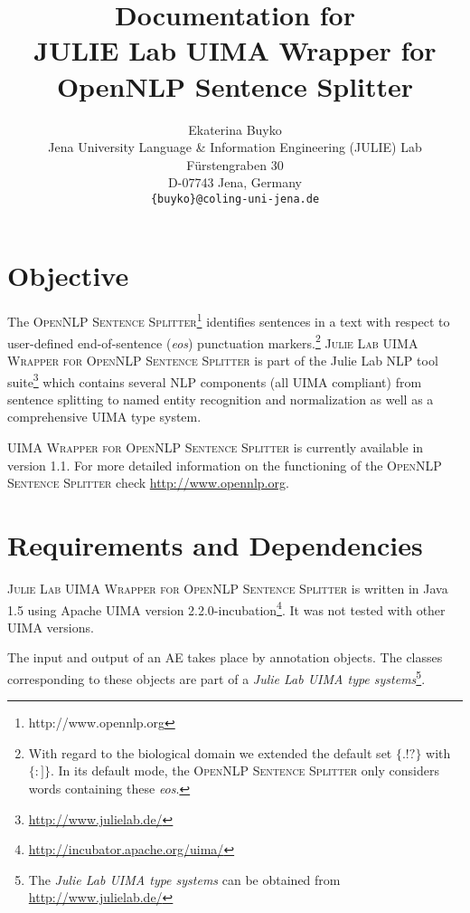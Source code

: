 \documentclass[11pt,a4paper,halfparskip]{scrartcl}
\title{\small{Documentation for}\\\huge JULIE Lab UIMA Wrapper for \\OpenNLP Sentence Splitter}
\author{\normalsize Ekaterina Buyko\\
  \normalsize  Jena University Language \& Information Engineering (JULIE) Lab\\
  \normalsize F\"urstengraben 30 \\
  \normalsize D-07743 Jena, Germany\\
  {\normalsize \tt \{buyko\}@coling-uni-jena.de} }
\date{}
\begin{document}
\maketitle

\section{Objective}


The \textsc{OpenNLP Sentence Splitter}\footnote{http://www.opennlp.org} identifies sentences in 
a text with respect to user-defined end-of-sentence (\textit{eos}) punctuation
markers.\footnote{With regard to the biological domain we extended the default set $\lbrace . ! ? 
\rbrace$ with $\lbrace : ] \rbrace$.  In its default mode, the
\textsc{OpenNLP Sentence Splitter} only considers words containing these
\textit{eos}.} \textsc{Julie Lab UIMA Wrapper for OpenNLP Sentence Splitter} is part of the Julie
Lab NLP tool suite\footnote{\url{http://www.julielab.de/}} which contains several NLP components
(all
UIMA compliant) from sentence splitting to named entity recognition and normalization as well as a
comprehensive UIMA type system.

\textsc{UIMA Wrapper for OpenNLP Sentence Splitter} is currently available in version 1.1.  For more
detailed information on the functioning of the \textsc{OpenNLP Sentence Splitter} check
\url{http://www.opennlp.org}.






\section{Requirements and Dependencies}

\textsc{Julie Lab UIMA Wrapper for OpenNLP Sentence Splitter} is written in Java 1.5 using Apache
UIMA version 2.2.0-incubation\footnote{\url{http://incubator.apache.org/uima/}}. It
was not tested with other UIMA versions.

The input and output of an AE takes place by annotation objects. The
classes corresponding to these objects are part of a \emph{Julie Lab UIMA
  type systems}\footnote{The \emph{Julie Lab UIMA type systems} can be
  obtained from \url{http://www.julielab.de/}}.
\end{document}
